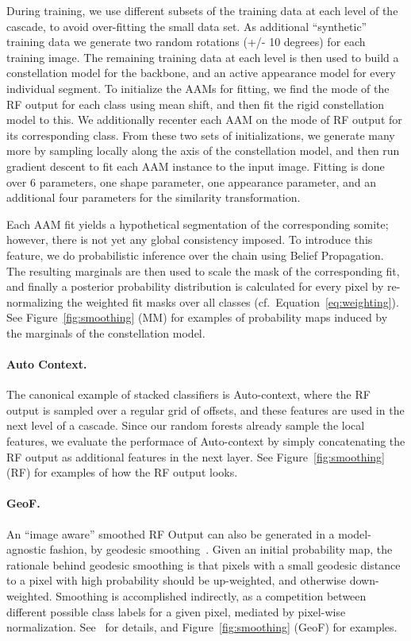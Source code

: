 \documentclass[10pt,twocolumn,letterpaper]{article}
\begin{document}
During training, we use different subsets of the training data at each level of the cascade, to avoid over-fitting the small data set. As additional ``synthetic'' training data we generate two random rotations (+/- 10 degrees) for each training image.  The remaining training data at each level is then used to build a constellation model for the backbone, and an active appearance model for every individual segment.  To initialize the AAMs for fitting, we find the mode of the RF output for each class using mean shift, and then fit the rigid constellation model to this.  We additionally recenter each AAM on the mode of RF output for its corresponding class.  From these two sets of initializations, we generate many more by sampling locally along the axis of the constellation model, and then run gradient descent to fit each AAM instance to the input image.  Fitting is done over 6 parameters, one shape parameter, one appearance parameter, and an additional four parameters for the similarity transformation.

Each AAM fit yields a hypothetical segmentation of the corresponding somite; however, there is not yet any global consistency imposed.  To introduce this feature, we do probabilistic inference over the chain using Belief Propagation.  The resulting marginals are then used to scale the mask of the corresponding fit, and finally a posterior probability distribution is calculated for every pixel by re-normalizing the weighted fit masks over all classes (cf.\ Equation~\eqref{eq:weighting}).  See Figure~\ref{fig:smoothing} (MM) for examples of probability maps induced by the marginals of the constellation model.

\paragraph{Auto Context. }

The canonical example of stacked classifiers is Auto-context, where the RF output is sampled over a regular grid of offsets, and these features are used in the next level of a cascade.  Since our random forests already sample the local features, we evaluate the performace of Auto-context by simply concatenating the RF output as additional features in the next layer.  See Figure~\ref{fig:smoothing} (RF) for examples of how the RF output looks.

\paragraph{GeoF. }
An ``image aware'' smoothed RF Output can also be generated in a model-agnostic fashion, by geodesic smoothing~\cite{GeoForests2013}. 
Given an initial probability map, the rationale behind geodesic smoothing is that pixels with a small geodesic distance to a pixel with high probability should be up-weighted, and otherwise down-weighted. Smoothing is accomplished indirectly, as a competition between different possible class labels for a given pixel, mediated by pixel-wise normalization. See~\cite{GeoForests2013} for details, and Figure~\ref{fig:smoothing} (GeoF) for examples.
\end{document}
